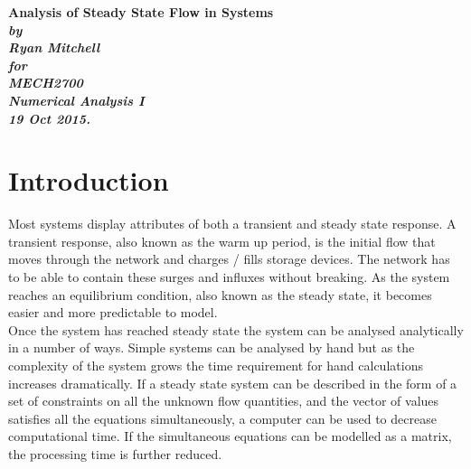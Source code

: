 \documentclass[11pt,a4paper]{article}
\begin{document}
 


\begin{titlepage}
\renewcommand{\baselinestretch}{1.0}
\begin{center}

\vspace*{30mm}
\Huge\bf
		Analysis of Steady State Flow in Systems\\
\vspace{20mm}
\large\sl
		by\\
		Ryan Mitchell
		\medskip\\
\rm
\large\sl
		for\\
		MECH2700\\
		Numerical Analysis I\\
\vspace{25mm}
		19 Oct 2015.		
\end{center}
\end{titlepage}


\tableofcontents
\listoffigures
\newpage

\section{Introduction}

Most systems display attributes of both a transient and steady state response. A transient response, also known as the warm up period, is the initial flow that moves through the network and charges / fills storage devices. The network has to be able to contain these surges and influxes without breaking. As the system reaches an equilibrium condition, also known as the steady state, it becomes easier and more predictable to model.\\

Once the system has reached steady state the system can be analysed analytically in a number of ways. Simple systems can be analysed by hand but as the complexity of the system grows the time requirement for hand calculations increases dramatically. If a steady state system can be described in the form of a set of constraints on all the unknown flow quantities, and the vector of values satisfies all the equations simultaneously, a computer can be used to decrease computational time. If the simultaneous equations can be modelled as a matrix, the processing time is further reduced.\\
\end{document}
